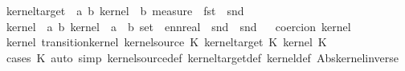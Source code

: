\begin{isabellebody}
\ kernel{\isacharunderscore}{\kern0pt}target\ {\isacharcolon}{\kern0pt}{\isacharcolon}{\kern0pt}\ {\isachardoublequoteopen}{\isacharparenleft}{\kern0pt}{\isacharprime}{\kern0pt}a{\isacharcomma}{\kern0pt}\ {\isacharprime}{\kern0pt}b{\isacharparenright}{\kern0pt}\ kernel\ {\isasymRightarrow}\ {\isacharprime}{\kern0pt}b\ measure{\isachardoublequoteclose}\ \ {\isachardoublequoteopen}fst\ {\isasymcirc}\ snd{\isachardoublequoteclose}%
\isadelimproof
\ %
\endisadelimproof
%
\isatagproof
\isacommand{{\isachardot}{\kern0pt}}\isamarkupfalse%
%
\endisatagproof
{\isafoldproof}%
%
\isadelimproof
%
\endisadelimproof
\isanewline
\isanewline
{}\isamarkupfalse%
\ kernel\ {\isacharcolon}{\kern0pt}{\isacharcolon}{\kern0pt}\ {\isachardoublequoteopen}{\isacharparenleft}{\kern0pt}{\isacharprime}{\kern0pt}a{\isacharcomma}{\kern0pt}\ {\isacharprime}{\kern0pt}b{\isacharparenright}{\kern0pt}\ kernel\ {\isasymRightarrow}\ {\isacharprime}{\kern0pt}a\ {\isasymRightarrow}\ {\isacharprime}{\kern0pt}b\ set\ {\isasymRightarrow}\ ennreal{\isachardoublequoteclose}\ \ {\isachardoublequoteopen}snd\ {\isasymcirc}\ snd{\isachardoublequoteclose}%
\isadelimproof
\ %
\endisadelimproof
%
\isatagproof
\isacommand{{\isachardot}{\kern0pt}}\isamarkupfalse%
%
\endisatagproof
{\isafoldproof}%
%
\isadelimproof
%
\endisadelimproof
\isanewline
\isanewline
{}\isamarkupfalse%
\ {\isacharbrackleft}{\kern0pt}{\isacharbrackleft}{\kern0pt}coercion\ kernel{\isacharbrackright}{\kern0pt}{\isacharbrackright}{\kern0pt}\isanewline
\isanewline
{}\isamarkupfalse%
\ kernel{\isacharcolon}{\kern0pt}\ transition{\isacharunderscore}{\kern0pt}kernel\ {\isachardoublequoteopen}kernel{\isacharunderscore}{\kern0pt}source\ K{\isachardoublequoteclose}\ {\isachardoublequoteopen}kernel{\isacharunderscore}{\kern0pt}target\ K{\isachardoublequoteclose}\ {\isachardoublequoteopen}kernel\ K{\isachardoublequoteclose}\isanewline
%
\isadelimproof
\ \ %
\endisadelimproof
%
\isatagproof
{}\isamarkupfalse%
\ {\isacharparenleft}{\kern0pt}cases\ K{\isacharparenright}{\kern0pt}\ {\isacharparenleft}{\kern0pt}auto\ simp{\isacharcolon}{\kern0pt}\ kernel{\isacharunderscore}{\kern0pt}source{\isacharunderscore}{\kern0pt}def\ kernel{\isacharunderscore}{\kern0pt}target{\isacharunderscore}{\kern0pt}def\ kernel{\isacharunderscore}{\kern0pt}def\ Abs{\isacharunderscore}{\kern0pt}kernel{\isacharunderscore}{\kern0pt}inverse{\isacharparenright}{\kern0pt}%
\endisatagproof
{\isafoldproof}%
%
\isadelimproof
\isanewline
%
\endisadelimproof

\end{isabellebody}
